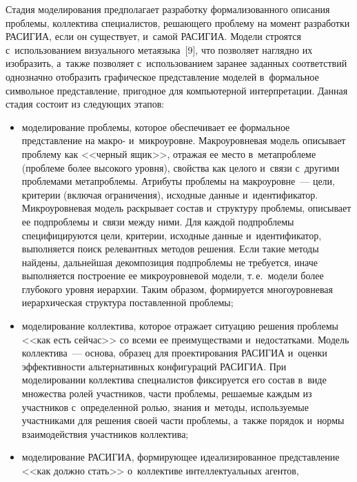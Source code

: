 \begin{multicols}{2}
  Стадия моделирования предполагает разработку формализованного описания 
проб\-ле\-мы, коллектива специалистов, ре\-ша\-юще\-го проб\-ле\-му на момент 
разработки \mbox{РАСИГИА}, если он существует, и~самой 
\mbox{РАСИГИА}. Модели строятся с~использованием визуального 
метаязыка~[9], что позволяет наглядно их изобразить, а~так\-же поз\-во\-ля\-ет 
с~использованием заранее заданных соответствий однозначно отоб\-ра\-зить 
графическое пред\-став\-ле\-ние моделей в~формальное символьное пред\-став\-ле\-ние, 
пригодное для компьютерной интерпретации. Данная стадия со\-сто\-ит из 
сле\-ду\-ющих этапов:
  \begin{itemize}
  \item моделирование проб\-ле\-мы, которое обеспечивает ее формальное 
пред\-став\-ле\-ние на макро- и~мик\-ро\-уров\-не. Мак\-ро\-уров\-не\-вая модель описывает 
проб\-ле\-му как <<чер\-ный ящик>>, отражая ее место в~ме\-та\-проб\-ле\-ме (проб\-ле\-ме 
более высокого уровня), свойства как целого и~связи с~другими проб\-ле\-ма\-ми 
ме\-та\-проб\-ле\-мы. Атрибуты проблемы на макроуровне~--- цели, критерии 
(включая ограничения), исходные данные и~идентификатор. Мик\-ро\-уров\-не\-вая 
модель раскрывает со\-став и~структуру проб\-ле\-мы, описывает ее под\-проб\-ле\-мы 
и~связи между ними. Для каждой под\-проб\-ле\-мы специфицируются цели, 
критерии, исходные данные и~идентификатор, выполняется поиск релевантных 
методов решения. Если такие методы найдены, дальнейшая декомпозиция 
под\-проб\-ле\-мы не требуется, иначе выполняется по\-стро\-ение ее мик\-ро\-уров\-не\-вой 
модели, т.\,е.\ модели более глубокого уров\-ня иерархии. Таким образом, 
формируется многоуровневая иерархическая структура по\-став\-лен\-ной 
проб\-лемы;
  \item моделирование коллектива, которое отражает ситуацию решения 
проб\-ле\-мы <<как есть сейчас>> со всеми ее преимуществами и~недостатками. 
Модель коллектива~--- основа, образец для проектирования \mbox{РАСИГИА} и~оценки эф\-фек\-тив\-ности 
альтернативных конфигураций \mbox{РАСИГИА}. 
При моделировании коллектива специалистов фиксируется его со\-став в~виде 
множества ролей участников, час\-ти проб\-ле\-мы, ре\-ша\-емые каж\-дым из 
участников с~определенной ролью, знания и~методы, ис\-поль\-зу\-емые 
участниками для решения своей части проб\-ле\-мы, а~так\-же порядок и~нормы 
взаимодействия участников коллектива; 
  \item моделирование \mbox{РАСИГИА}, фор\-ми\-ру\-ющее идеализированное 
пред\-став\-ле\-ние <<как должно стать>> о~коллективе интеллектуальных агентов, 

\end{itemize}
\end{multicols}
